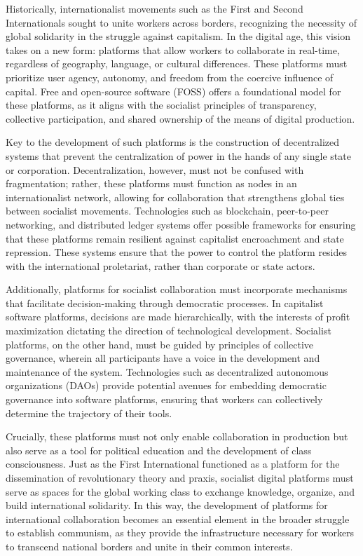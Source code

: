 \begin{refsection}
Historically, internationalist movements such as the First and Second Internationals sought to unite workers across borders, recognizing the necessity of global solidarity in the struggle against capitalism. In the digital age, this vision takes on a new form: platforms that allow workers to collaborate in real-time, regardless of geography, language, or cultural differences. These platforms must prioritize user agency, autonomy, and freedom from the coercive influence of capital. Free and open-source software (FOSS) offers a foundational model for these platforms, as it aligns with the socialist principles of transparency, collective participation, and shared ownership of the means of digital production.

Key to the development of such platforms is the construction of decentralized systems that prevent the centralization of power in the hands of any single state or corporation. Decentralization, however, must not be confused with fragmentation; rather, these platforms must function as nodes in an internationalist network, allowing for collaboration that strengthens global ties between socialist movements. Technologies such as blockchain, peer-to-peer networking, and distributed ledger systems offer possible frameworks for ensuring that these platforms remain resilient against capitalist encroachment and state repression. These systems ensure that the power to control the platform resides with the international proletariat, rather than corporate or state actors.

Additionally, platforms for socialist collaboration must incorporate mechanisms that facilitate decision-making through democratic processes. In capitalist software platforms, decisions are made hierarchically, with the interests of profit maximization dictating the direction of technological development. Socialist platforms, on the other hand, must be guided by principles of collective governance, wherein all participants have a voice in the development and maintenance of the system. Technologies such as decentralized autonomous organizations (DAOs) provide potential avenues for embedding democratic governance into software platforms, ensuring that workers can collectively determine the trajectory of their tools.

Crucially, these platforms must not only enable collaboration in production but also serve as a tool for political education and the development of class consciousness. Just as the First International functioned as a platform for the dissemination of revolutionary theory and praxis, socialist digital platforms must serve as spaces for the global working class to exchange knowledge, organize, and build international solidarity. In this way, the development of platforms for international collaboration becomes an essential element in the broader struggle to establish communism, as they provide the infrastructure necessary for workers to transcend national borders and unite in their common interests.


\end{refsection}
